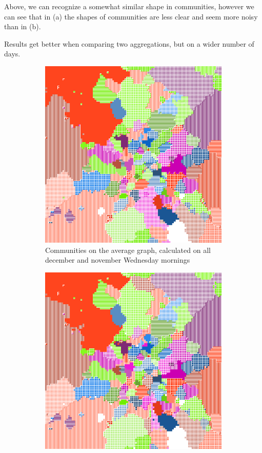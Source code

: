 \documentclass[12pt,a4paper]{article}
\begin{document}
Above, we can recognize a somewhat similar shape in communities, however we can see that in (a) the shapes of communities are less clear and seem more noisy than in (b).

Results get better when comparing two aggregations, but on a wider number of days.

\begin{figure}[H]
\begin{subfigure}[b]{0.48\textwidth}
\includegraphics[width=\textwidth]{wenDet/2WedMatrix.png}
\caption{Communities on the average graph, calculated on all december and november Wednesday mornings}
\end{subfigure}
\begin{subfigure}[b]{0.48\textwidth}
\includegraphics[width=\textwidth]{wenDet/1Wed.png}

\end{subfigure}
\end{figure}
\end{document}
